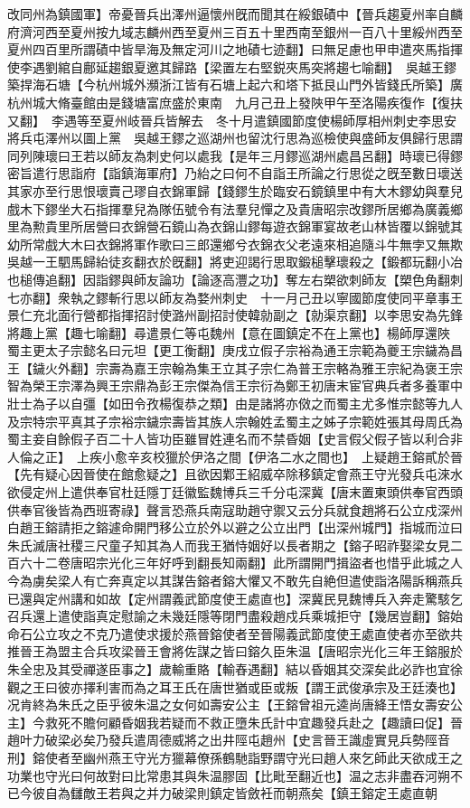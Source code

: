 改同州為鎮國軍】帝憂晉兵出澤州逼懷州旣而聞其在綏銀磧中【晉兵趨夏州率自麟府濟河西至夏州按九域志麟州西至夏州三百五十里西南至銀州一百八十里綏州西至夏州四百里所謂磧中皆旱海及無定河川之地磧七迹翻】曰無足慮也甲申遣夾馬指揮使李遇劉綰自鄜延趨銀夏邀其歸路【梁置左右堅鋭夾馬突將趨七喻翻】　吳越王鏐築捍海石塘【今杭州城外瀕浙江皆有石塘上起六和塔下抵艮山門外皆錢氏所築】廣杭州城大脩臺館由是錢塘富庶盛於東南　九月己丑上發陜甲午至洛陽疾復作【復扶又翻】　李遇等至夏州岐晉兵皆解去　冬十月遣鎮國節度使楊師厚相州刺史李思安將兵屯澤州以圖上黨　吳越王鏐之巡湖州也留沈行思為巡檢使與盛師友俱歸行思謂同列陳瓌曰王若以師友為刺史何以處我【是年三月鏐巡湖州處昌呂翻】時瓌已得鏐密旨遣行思詣府【詣鎮海軍府】乃紿之曰何不自詣王所論之行思從之旣至數日瓌送其家亦至行思恨瓌賣己璆自衣錦軍歸【錢鏐生於臨安石鏡鎮里中有大木鏐幼與羣兒戲木下鏐坐大石指揮羣兒為隊伍號令有法羣兒憚之及貴唐昭宗改鏐所居鄉為廣義鄉里為勲貴里所居營曰衣錦營石鏡山為衣錦山鏐每遊衣錦軍宴故老山林皆覆以錦號其幼所常戲大木曰衣錦將軍作歌曰三郎還鄉兮衣錦衣父老遠來相追隨斗牛無孛又無欺吳越一王駟馬歸紿徒亥翻衣於旣翻】將吏迎謁行思取鍛槌擊瓌殺之【鍛都玩翻小冶也槌傳追翻】因詣鏐與師友論功【論逐高灃之功】奪左右槊欲刺師友【槊色角翻刺七亦翻】衆執之鏐斬行思以師友為婺州刺史　十一月己丑以寧國節度使同平章事王景仁充北面行營都指揮招討使潞州副招討使韓勍副之【勍渠京翻】以李思安為先鋒將趣上黨【趣七喻翻】尋遣景仁等屯魏州【意在圖鎮定不在上黨也】楊師厚還陜　蜀主更太子宗懿名曰元坦【更工衡翻】庚戌立假子宗裕為通王宗範為夔王宗鐬為昌王【鐬火外翻】宗壽為嘉王宗翰為集王立其子宗仁為普王宗輅為雅王宗紀為褒王宗智為榮王宗澤為興王宗鼎為彭王宗傑為信王宗衍為鄭王初唐末宦官典兵者多養軍中壯士為子以自彊【如田令孜楊復恭之類】由是諸將亦傚之而蜀主尤多惟宗懿等九人及宗特宗平真其子宗裕宗鐬宗壽皆其族人宗翰姓孟蜀主之姊子宗範姓張其母周氏為蜀主妾自餘假子百二十人皆功臣雖冒姓連名而不禁昏姻【史言假父假子皆以利合非人倫之正】　上疾小愈辛亥校獵於伊洛之間【伊洛二水之間也】　上疑趙王鎔貳於晉【先有疑心因晉使在館愈疑之】且欲因鄴王紹威卒除移鎮定會燕王守光發兵屯淶水欲侵定州上遣供奉官杜廷隱丁廷徽監魏博兵三千分屯深冀【唐末置東頭供奉官西頭供奉官後皆為西班寄祿】聲言恐燕兵南寇助趙守禦又云分兵就食趙將石公立戍深州白趙王鎔請拒之鎔遽命開門移公立於外以避之公立出門【出深州城門】指城而泣曰朱氏滅唐社稷三尺童子知其為人而我王猶恃姻好以長者期之【鎔子昭祚娶梁女見二百六十二卷唐昭宗光化三年好呼到翻長知兩翻】此所謂開門揖盜者也惜乎此城之人今為虜矣梁人有亡奔真定以其謀告鎔者鎔大懼又不敢先自絶但遣使詣洛陽訴稱燕兵已還與定州講和如故【定州謂義武節度使王處直也】深冀民見魏博兵入奔走驚駭乞召兵還上遣使詣真定慰諭之未幾廷隱等閉門盡殺趙戍兵乘城拒守【幾居豈翻】鎔始命石公立攻之不克乃遣使求援於燕晉鎔使者至晉陽義武節度使王處直使者亦至欲共推晉王為盟主合兵攻梁晉王會將佐謀之皆曰鎔久臣朱温【唐昭宗光化三年王鎔服於朱全忠及其受禪遂臣事之】歲輸重賂【輸舂遇翻】結以昏姻其交深矣此必詐也宜徐觀之王曰彼亦擇利害而為之耳王氏在唐世猶或臣或叛【謂王武俊承宗及王廷湊也】况肯終為朱氏之臣乎彼朱温之女何如壽安公主【王鎔曾祖元逵尚唐絳王悟女壽安公主】今救死不贍何顧昏姻我若疑而不救正墮朱氏計中宜趣發兵赴之【趣讀曰促】晉趙叶力破梁必矣乃發兵遣周德威將之出井陘屯趙州【史言晉王識虛實見兵勢陘音刑】鎔使者至幽州燕王守光方獵幕僚孫鶴馳詣野謂守光曰趙人來乞師此天欲成王之功業也守光曰何故對曰比常患其與朱温膠固【比毗至翻近也】温之志非盡吞河朔不已今彼自為讎敵王若與之并力破梁則鎮定皆斂衽而朝燕矣【鎮王鎔定王處直朝